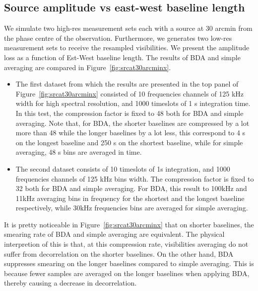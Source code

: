 \documentclass[useAMS,usenatbib]{mn2e}
\begin{document}
\subsection{Source amplitude vs east-west baseline length} 
We simulate two high-res measurement sets each with a source at 30 arcmin from the phase centre of the observation.
Furthermore, we generates two low-res measurement sets to receive the resampled visibilities. We present the amplitude loss 
as a function of Est-West baseline length.
The results of  BDA and simple averaging are compared in Figure~\ref{fig:srcat30arcminx}. 
 \begin{itemize}
  \item The first dataset from which the results are presented 
 in the top panel of Figure~\ref{fig:srcat30arcminx} consisted of 10 frequencies
 channels of 125 kHz width for high spectral resolution, and
 1000 timeslots of 1 s integration time.  
 In this test, the  compression factor is fixed to 48 both for BDA and simple averaging.
  Note that, for  BDA, the shorter baselines are compressed by a lot more than 48 while the longer baselines
 by a lot less, this correspond to  4 s on the longest baseline and 250 s on the shortest baseline, while 
 for simple averaging, 48 s bins are averaged in time. 

  \item The second dataset consists of 10 timeslots of 1s integration, and
 1000 frequencies channels of 125 kHz bins width.  The compression factor is fixed to 32 both for BDA and simple averaging.
 For BDA, this result to 100kHz and 11kHz averaging bins in frequency for the shortest and the longest baseline respectively, 
 while 30kHz frequencies bins are averaged for simple averaging.
\end{itemize}
It is  pretty noticeable in Figure~\ref{fig:srcat30arcminx} that on shorter baselines, the smearing rate of  
BDA and simple averaging are equivalent. The physical interpretion of this is that, at this compression rate, 
visibilities averaging do not suffer from decorrelation on the shorter baselines. On the other hand,  BDA suppresses smearing 
on the longer baselines compared to simple averaging. This is because fewer samples are averaged on the longer baselines 
when applying BDA, thereby causing a decrease in decorrelation.
\end{document}
